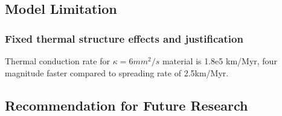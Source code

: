 
\subsection{Model Limitation}

\subsubsection{Fixed thermal structure effects and justification}
Thermal conduction rate for $\kappa=6mm^{2}/s$ material is 1.8e5 km/Myr, four magnitude faster compared to spreading rate of 2.5km/Myr.

\subsection{Recommendation for Future Research}

